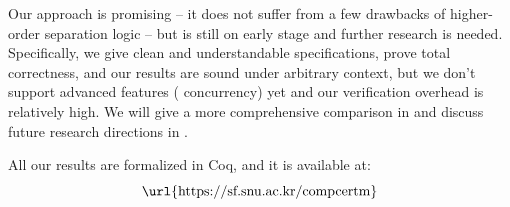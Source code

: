 
Our approach is promising -- it does not suffer from a few drawbacks of higher-order separation logic -- but is still on early stage and further research is needed.
Specifically, we give clean and understandable specifications, prove total correctness, and our results are sound under arbitrary context, but we don't support advanced features (\eg{} concurrency) yet and our verification overhead is relatively high.
We will give a more comprehensive comparison in  and discuss future research directions in .









\bigskip
All our results are formalized in Coq, and it is available at: \[ \text{\url{https://sf.snu.ac.kr/compcertm}} \]


